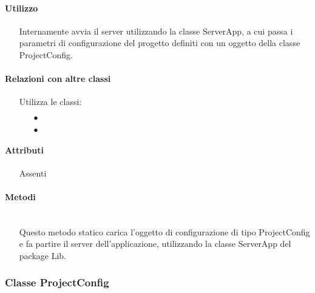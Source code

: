 \paragraph*{Utilizzo}
\begin{itemize}
\item[] Internamente avvia il server utilizzando la classe ServerApp, a cui passa i parametri di configurazione del progetto definiti con un oggetto della classe ProjectConfig.
\end{itemize}

\paragraph*{Relazioni con altre classi}
\begin{itemize}


\item[] Utilizza le classi:
\begin{itemize}
\item[$\bullet$] 
\item[$\bullet$] 
\end{itemize}
\end{itemize}

\paragraph*{Attributi}
\begin{itemize}
\item[] Assenti
\end{itemize}

\paragraph*{Metodi}
\begin{itemize}
\item[]  \\ Questo metodo statico carica l'oggetto di configurazione di tipo ProjectConfig e fa partire il server dell'applicazione, utilizzando la classe ServerApp del package Lib.
\end{itemize}

\subsubsection{Classe ProjectConfig}

